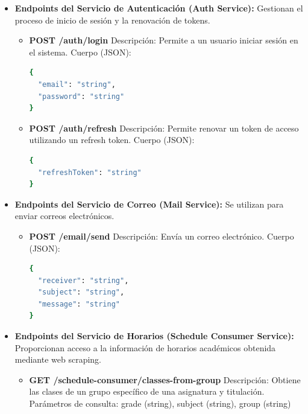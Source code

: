 \begin{itemize}
    \item \textbf{Endpoints del Servicio de Autenticación (Auth Service):}
    Gestionan el proceso de inicio de sesión y la renovación de tokens.
    \begin{itemize}
        \item \textbf{POST /auth/login}
        \newline Descripción: Permite a un usuario iniciar sesión en el sistema.
        \newline Cuerpo (JSON):
\begin{lstlisting}[language=bash]
{
  "email": "string",
  "password": "string"
}
\end{lstlisting}

        \item \textbf{POST /auth/refresh}
        \newline Descripción: Permite renovar un token de acceso utilizando un refresh token.
        \newline Cuerpo (JSON):
\begin{lstlisting}[language=bash]
{
  "refreshToken": "string"
}
\end{lstlisting}
    \end{itemize}

    \item \textbf{Endpoints del Servicio de Correo (Mail Service):}
    Se utilizan para enviar correos electrónicos.
    \begin{itemize}
        \item \textbf{POST /email/send}
        \newline Descripción: Envía un correo electrónico.
        \newline Cuerpo (JSON):
\begin{lstlisting}[language=bash]
{
  "receiver": "string",
  "subject": "string",
  "message": "string"
}
\end{lstlisting}
    \end{itemize}

    \item \textbf{Endpoints del Servicio de Horarios (Schedule Consumer Service):}
    Proporcionan acceso a la información de horarios académicos obtenida mediante web scraping.
    \begin{itemize}
        \item \textbf{GET /schedule-consumer/classes-from-group}
        \newline Descripción: Obtiene las clases de un grupo específico de una asignatura y titulación.
        \newline Parámetros de consulta: grade (string), subject (string), group (string)


\end{itemize}
\end{itemize}

